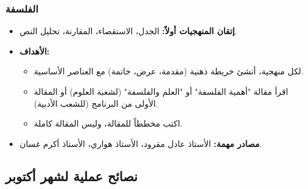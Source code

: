 \documentclass[12pt,a4paper]{book}
\begin{document}
	\subsubsection{الفلسفة}
	
	\begin{itemize}
		\item \textbf{إتقان المنهجيات أولاً:} الجدل، الاستقصاء، المقارنة، تحليل النص.
		\item \textbf{الأهداف:}
		\begin{itemize}
			\item لكل منهجية، أنشئ خريطة ذهنية (مقدمة، عرض، خاتمة) مع العناصر الأساسية.
			\item اقرأ مقالة "أهمية الفلسفة" أو "العلم والفلسفة" (لشعبة العلوم) أو المقالة الأولى من البرنامج (للشعب الأدبية).
			\item اكتب مخططاً للمقالة، وليس المقالة كاملة.
		\end{itemize}
		\item \textbf{مصادر مهمة:} الأستاذ عادل مقرود، الأستاذ هواري، الأستاذ أكرم غسان.
	\end{itemize}
	
	\subsection{نصائح عملية لشهر أكتوبر}
	\label{sec:random-tips2}
	
\end{document}
